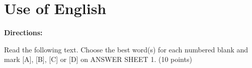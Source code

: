 \section{Use of English}

\textbf{Directions:}

Read the following text. Choose the best word(s) for each numbered blank and mark [A], [B], [C] or [D] on ANSWER SHEET 1. (10 points)

\vspace{6pt}